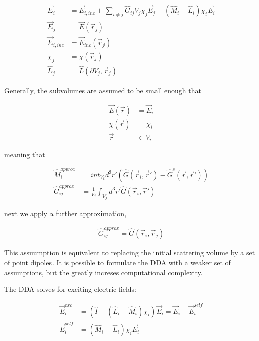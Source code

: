             \begin{align}
                \vec{E}_i &= \vec{E}_{i, inc} + \sum_{i\neq j}\hat{G}_{ij}V_j\chi_j\vec{E}_j + \left(\hat{M}_i -\hat{L}_i\right)\chi_i\vec{E}_i \\
                \vec{E}_j &= \vec{E}(\vec{r}_j) \\
                \vec{E}_{i, inc} &= \vec{E}_{inc}(\vec{r}_j) \\
                \chi_j &= \chi(\vec{r}_j) \\
                \hat{L}_j &= \hat{L}(\partial V_j, \vec{r}_j)
            \end{align}

            Generally, the subvolumes are assumed to be small enough that

            \begin{align}
                \vec{E}(\vec{r}) &= \vec{E}_i \\
                \chi(\vec{r}) &= \chi_i \\
                \vec{r} &\in V_i
            \end{align}

            meaning that

            \begin{align}
                \hat{M}_{i}^{approx} &= int_{V_i}d^3r'\left(\hat{G}(\vec{r}_i, \vec{r}') - \hat{G}^s(\vec{r}, \vec{r}')\right) \\
                \hat{G}_{ij}^{approx} &= \frac{1}{V_j}\int_{V_j}d^3r'\hat{G}(\vec{r}_i, \vec{r}')
            \end{align}

            next we apply a further approximation,

            \begin{align}
                \hat{G}_{ij}^{approx} = \hat{G}(\vec{r}_i, \vec{r}_j)
            \end{align}

            This assuumption is equivalent to replacing the initial scattering volume by a set of point dipoles. It is possible
            to formulate the DDA with a weaker set of assumptions, but the greatly increses computational complexity.

            The DDA solves for exciting electric fields:

            \begin{align}
                \vec{E}_i^{exc} &= \left(\hat{I} + \left(\hat{L}_i - \hat{M}_i \right)\chi_i\right)\vec{E}_i = \vec{E}_i - \vec{E}_i^{self} \\
                \vec{E}_i^{self}&= \left(\hat{M}_i - \hat{L}_i \right)\chi_i\vec{E}_i
            \end{align}

